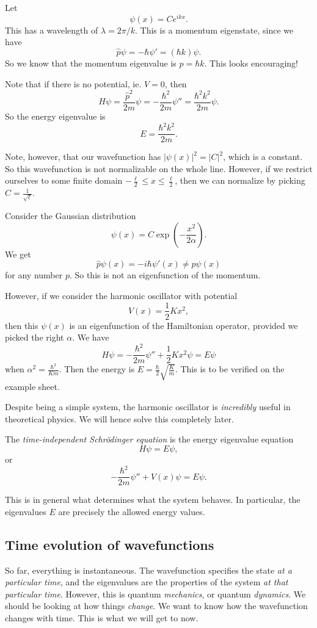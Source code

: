 \documentclass[a4paper]{article}
\begin{document}
\begin{eg}
  Let
  \[
    \psi(x) = Ce^{ikx}.
  \]
  This has a wavelength of $\lambda = 2\pi/k$. This is a momentum eigenstate, since we have
  \[
    \hat{p}\psi = -\hbar \psi' = (\hbar k)\psi.
  \]
  So we know that the momentum eigenvalue is $p = \hbar k$. This looks encouraging!

  Note that if there is no potential, ie. $V = 0$, then
  \[
    H\psi = \frac{\hat{p}^2}{2m}\psi = -\frac{\hbar^2}{2m}\psi'' = \frac{\hbar^2 k^2}{2m}\psi.
  \]
  So the energy eigenvalue is
  \[
    E = \frac{\hbar^2 k^2}{2m}.
  \]
\end{eg}
Note, however, that our wavefunction has $|\psi(x)|^2 = |C|^2$, which is a constant. So this wavefunction is not normalizable on the whole line. However, if we restrict ourselves to some finite domain $-\frac{\ell}{2} \leq x \leq \frac{\ell}{2}$, then we can normalize by picking $C= \frac{1}{\sqrt{\ell}}$.

\begin{eg}
  Consider the Gaussian distribution
  \[
    \psi(x) = C\exp\left(-\frac{x^2}{2\alpha}\right).
  \]
  We get
  \[
    \hat{p}\psi(x) = -i\hbar \psi'(x) \not= p\psi(x)
  \]
  for any number $p$. So this is not an eigenfunction of the momentum.

  However, if we consider the harmonic oscillator with potential
  \[
    V(x) = \frac{1}{2}Kx^2,
  \]
  then this $\psi(x)$ is an eigenfunction of the Hamiltonian operator, provided we picked the right $\alpha$. We have
  \[
    H\psi = -\frac{\hbar^2}{2m}\psi'' + \frac{1}{2}Kx^2 \psi = E\psi
  \]
  when $\alpha^2 = \frac{\hbar^2}{Km}$. Then the energy is $E = \frac{\hbar}{2}\sqrt{\frac{K}{m}}$. This is to be verified on the example sheet.
\end{eg}
Despite being a simple system, the harmonic oscillator is \emph{incredibly} useful in theoretical physics. We will hence solve this completely later.

\begin{defi}
  The \emph{time-independent Schr\"odinger equation} is the energy eigenvalue equation
  \[
    H\psi = E\psi,
  \]
  or
  \[
    -\frac{\hbar^2}{2m}\psi'' + V(x) \psi = E\psi.
  \]
\end{defi}
This is in general what determines what the system behaves. In particular, the eigenvalues $E$ are precisely the allowed energy values.

\subsection{Time evolution of wavefunctions}
So far, everything is instantaneous. The wavefunction specifies the state \emph{at a particular time}, and the eigenvalues are the properties of the system \emph{at that particular time}. However, this is quantum \emph{mechanics}, or quantum \emph{dynamics}. We should be looking at how things \emph{change}. We want to know how the wavefunction changes with time. This is what we will get to now.
\end{document}
